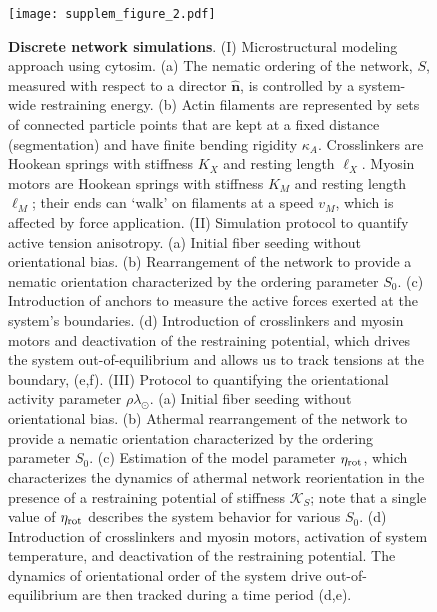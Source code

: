 \begin{figure}[p]
	\centering
	\texttt{[image: supplem\_figure\_2.pdf]}
	\caption{ \textbf{Discrete network simulations}. (I) Microstructural modeling approach using cytosim. (a) The nematic ordering of the network, $S$, measured with respect to a director $\hat{\bm{n}}$, is controlled by a system-wide restraining energy. (b) Actin filaments are represented by sets of connected particle points that are kept at a fixed distance (segmentation) and have finite bending rigidity $\kappa_A$. Crosslinkers are Hookean springs with stiffness $K_X$ and resting length $\ell_X$. Myosin motors are Hookean springs with stiffness $K_M$ and resting length $\ell_M$; their ends can `walk' on filaments at a speed $v_M$, which is affected by force application.  (II) Simulation protocol to quantify active tension anisotropy. (a) Initial fiber seeding without orientational bias. (b) Rearrangement of the network to provide a nematic orientation characterized by the ordering parameter $S_0$. (c) Introduction of anchors to measure the active forces exerted at the system's boundaries. (d) Introduction of crosslinkers and myosin motors and deactivation of the restraining potential, which drives the system out-of-equilibrium and allows us to track tensions at the boundary, (e,f). (III) Protocol to  quantifying the orientational activity parameter $\rho \lambda_{\odot}$. (a) Initial fiber seeding without orientational bias. (b) Athermal rearrangement of the network to provide a nematic orientation characterized by the ordering parameter $S_0$. (c) Estimation of the model parameter $\eta_{\rm rot}$, which characterizes the dynamics of athermal network reorientation in the presence of a restraining potential of stiffness $\mathcal{K}_S$; note that a single value of $\eta_{\rm rot}$  describes the system behavior for various $S_0$. (d) Introduction of crosslinkers and myosin motors, activation of system temperature, and deactivation of the restraining potential. The dynamics of orientational order of the system drive out-of-equilibrium are then tracked during a time period (d,e). }
	\label{supplem_fig_3}
\end{figure}

